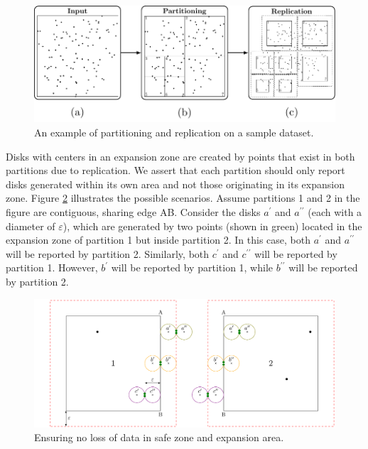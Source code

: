 \begin{figure}
    \centering
    \includegraphics[width=\linewidth]{chapter4/figures/PartReplication/P123}
    \caption{An example of partitioning and replication on a sample dataset.}\label{fig:partrep}
\end{figure}

Disks with centers in an expansion zone are created by points that exist in both partitions due to replication. We assert that each partition should only report disks generated within its own area and not those originating in its expansion zone. Figure \ref{fig:ensuring} illustrates the possible scenarios. Assume partitions 1 and 2 in the figure are contiguous, sharing edge AB. Consider the disks $a^\prime$ and $a^{\prime\prime}$ (each with a diameter of $\varepsilon$), which are generated by two points (shown in green) located in the expansion zone of partition 1 but inside partition 2. In this case, both $a^\prime$ and $a^{\prime\prime}$ will be reported by partition 2. Similarly, both $c^\prime$ and $c^{\prime\prime}$ will be reported by partition 1. However, $b^\prime$ will be reported by partition 1, while $b^{\prime\prime}$ will be reported by partition 2.

\begin{figure}
    \centering
    \includegraphics[width=\linewidth]
    {chapter4/figures/merge.pdf}
    \caption{Ensuring no loss of data in safe zone and expansion area.}\label{fig:ensuring}
\end{figure}

